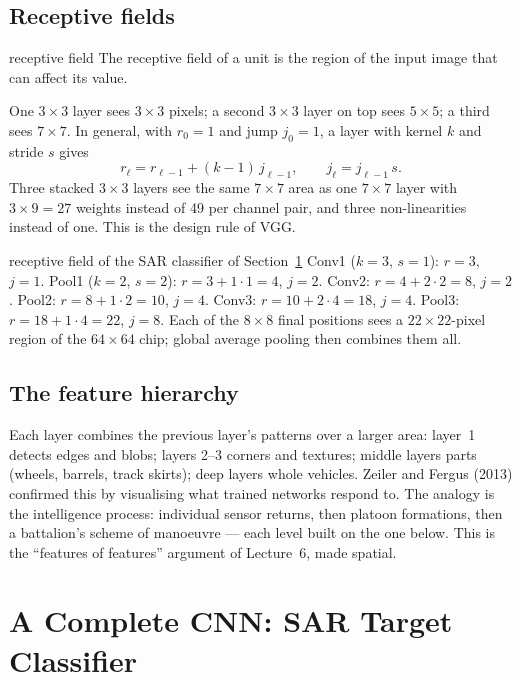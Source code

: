 \documentclass[11pt]{article}
\begin{document}
\subsection{Receptive fields}
\begin{definition}{receptive field}
The receptive field of a unit is the region of the input image that can affect its value.
\end{definition}
One $3\times3$ layer sees $3\times3$ pixels; a second $3\times3$ layer on top sees $5\times5$; a third sees $7\times7$. In general, with $r_0=1$ and jump $j_0=1$, a layer with kernel $k$ and stride $s$ gives
\[r_\ell=r_{\ell-1}+(k-1)\,j_{\ell-1},\qquad j_\ell=j_{\ell-1}\,s.\]
Three stacked $3\times3$ layers see the same $7\times7$ area as one $7\times7$ layer with $3\times9=27$ weights instead of 49 per channel pair, and three non-linearities instead of one. This is the design rule of VGG.
\begin{example}{receptive field of the SAR classifier of Section~\ref{sec:sar}}
Conv1 ($k=3$, $s=1$): $r=3$, $j=1$. Pool1 ($k=2$, $s=2$): $r=3+1\cdot1=4$, $j=2$. Conv2: $r=4+2\cdot2=8$, $j=2$. Pool2: $r=8+1\cdot2=10$, $j=4$. Conv3: $r=10+2\cdot4=18$, $j=4$. Pool3: $r=18+1\cdot4=22$, $j=8$. Each of the $8\times8$ final positions sees a $22\times22$-pixel region of the $64\times64$ chip; global average pooling then combines them all.
\end{example}

\subsection{The feature hierarchy}
Each layer combines the previous layer's patterns over a larger area: layer~1 detects edges and blobs; layers 2--3 corners and textures; middle layers parts (wheels, barrels, track skirts); deep layers whole vehicles. Zeiler and Fergus (2013) confirmed this by visualising what trained networks respond to. The analogy is the intelligence process: individual sensor returns, then platoon formations, then a battalion's scheme of manoeuvre --- each level built on the one below. This is the ``features of features'' argument of Lecture~6, made spatial.

\section{A Complete CNN: SAR Target Classifier}\label{sec:sar}
\end{document}
